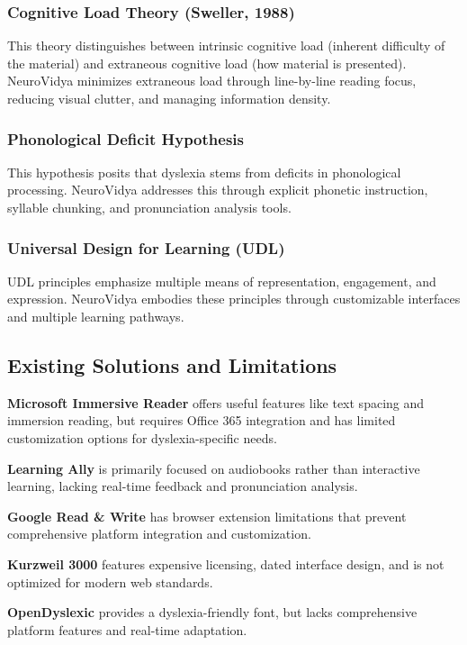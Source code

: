 \documentclass[journal]{IEEEtran}
\begin{document}
\subsubsection{Cognitive Load Theory (Sweller, 1988)}
This theory distinguishes between intrinsic cognitive load (inherent difficulty of the material) and extraneous cognitive load (how material is presented). NeuroVidya minimizes extraneous load through line-by-line reading focus, reducing visual clutter, and managing information density.

\subsubsection{Phonological Deficit Hypothesis}
This hypothesis posits that dyslexia stems from deficits in phonological processing. NeuroVidya addresses this through explicit phonetic instruction, syllable chunking, and pronunciation analysis tools.

\subsubsection{Universal Design for Learning (UDL)}
UDL principles emphasize multiple means of representation, engagement, and expression. NeuroVidya embodies these principles through customizable interfaces and multiple learning pathways.

\subsection{Existing Solutions and Limitations}

\textbf{Microsoft Immersive Reader} offers useful features like text spacing and immersion reading, but requires Office 365 integration and has limited customization options for dyslexia-specific needs.

\textbf{Learning Ally} is primarily focused on audiobooks rather than interactive learning, lacking real-time feedback and pronunciation analysis.

\textbf{Google Read \& Write} has browser extension limitations that prevent comprehensive platform integration and customization.

\textbf{Kurzweil 3000} features expensive licensing, dated interface design, and is not optimized for modern web standards.

\textbf{OpenDyslexic} provides a dyslexia-friendly font, but lacks comprehensive platform features and real-time adaptation.
\end{document}
